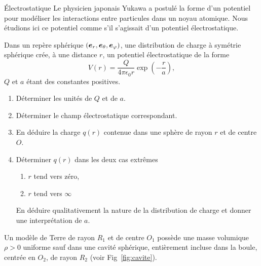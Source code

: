 \begin{td}{Électrostatique}
	Le physicien japonais Yukawa a postulé la forme d'un potentiel pour modéliser
	les interactions entre particules dans un noyau atomique. Nous étudions
	ici ce potentiel comme s'il s'agissait d'un potentiel électrostatique.

	Dans un repère sphérique $(\er, \etheta, \ephi)$, une distribution de 
	charge à symétrie sphérique crée, à une distance $r$,
	un potentiel électrostatique de la forme
	\begin{equation}
		V(r) = \dfrac{Q}{4 \pi \epsilon_0 r} \exp\left(-\dfrac{r}{a}\right),
	\end{equation}
	$Q$ et $a$ étant des constantes positives.

	\begin{enumerate}
		\item Déterminer les unités de $Q$ et de $a$.
		\item Déterminer le champ électrostatique correspondant.
		\item En déduire la charge $q(r)$ contenue dans une sphère de 
		  rayon $r$ et de centre $O$.
		\item Déterminer $q(r)$ dans les deux cas extrêmes
			\begin{enumerate}
				\item $r$ tend vers zéro,
				\item $r$ tend vers $\infty$
			\end{enumerate}
		 En déduire qualitativement la nature de la distribution de charge
		 et donner une interprétation de $a$.
 	\end{enumerate}


Un modèle de Terre de rayon $R_1$ et de centre $O_1$ possède une masse volumique 
$\rho>0$ uniforme sauf dans une cavité sphérique, 
entièrement incluse dans la boule, centrée en $O_2$, de rayon $R_2$
(voir Fig~\ref{fig:cavite}). 


\end{td}
